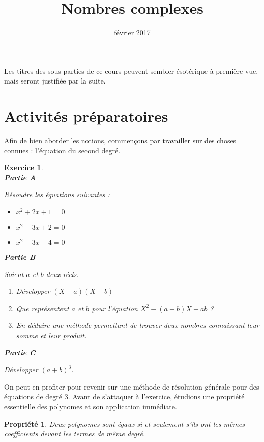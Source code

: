 \documentclass[11pt,a4paper,french]{article}
\title{Nombres complexes}
\author{\bsc{Jumel}}
\date{février 2017}
\makeatletter
\renewcommand{\maketitle}%
{\framebox{%
    \begin{minipage}{1.0\linewidth}%
      \begin{center}%
        \Large \@title ~-- \@author \\%
        \@date%
      \end{center}%
    \end{minipage}}%
  \normalsize%
}
\theoremstyle{break}
\newtheorem{propriete}{Propriété}
\theoremstyle{plain}
\newtheorem{exerciceT}{Exercice}
\theoremstyle{nonumberplain}
\theoremstyle{nonumberbreak}
\newenvironment{exercice}{\begin{framed}\begin{exerciceT}}{\end{exerciceT}\end{framed}}
\makeatother
\begin{document}
\noindent\maketitle

\bigskip

Les titres des sous parties de ce cours peuvent sembler ésotérique à
première vue, mais seront justifiée par la suite.

\section*{Activités préparatoires}

Afin de bien aborder les notions, commençons par travailler sur des
choses connues : l'équation du second degré.

\begin{exercice}~\\
  \textbf{Partie A}

  Résoudre les équations suivantes :
  \begin{itemize}
    \item $x^2 + 2x + 1 = 0$
    \item $x^2 - 3x + 2 = 0$
    \item $x^2 - 3x - 4 = 0$
  \end{itemize}

  \noindent\textbf{Partie B}

  Soient $a$ et $b$ deux réels.
  \begin{enumerate}
    \item Développer $(X - a)(X - b)$
    \item Que représentent $a$ et $b$ pour l'équation $X^2 - (a+b)X +
      ab$ ?
    \item En déduire une méthode permettant de trouver deux nombres
      connaissant leur somme et leur produit.
  \end{enumerate}

   \noindent\textbf{Partie C}

   Développer $(a+b)^3$.
\end{exercice}

On peut en profiter pour revenir sur une méthode de résolution générale
pour des équations de degré 3. Avant de s'attaquer à l'exercice,
étudions une propriété essentielle des polynomes et son application
immédiate.

\begin{propriete}
  Deux polynomes sont égaux si et seulement s'ils ont les mêmes
  coefficients devant les termes de même degré.
\end{propriete}
\end{document}
